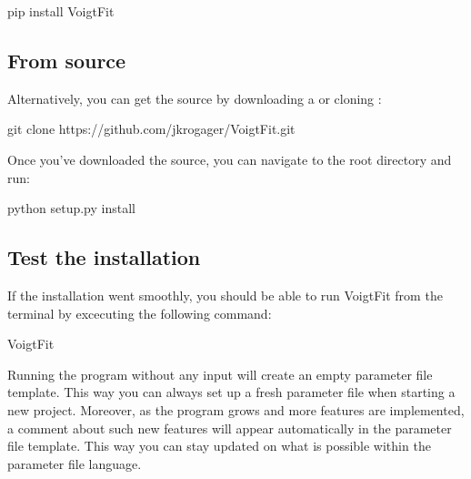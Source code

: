 \documentclass[letterpaper,10pt,english]{sphinxmanual}
\begin{document}
%
\begin{sphinxVerbatim}[commandchars=\\\{\}]
\PYGZpc{}\PYG{o}{]} pip install VoigtFit
\end{sphinxVerbatim}


\subsection{From source}
\label{\detokenize{install:from-source}}
Alternatively, you can get the source by downloading a  or cloning :

%
\begin{sphinxVerbatim}[commandchars=\\\{\}]
\PYGZpc{}\PYG{o}{]} git clone https://github.com/jkrogager/VoigtFit.git
\end{sphinxVerbatim}

Once you’ve downloaded the source, you can navigate to the root
directory and run:

%
\begin{sphinxVerbatim}[commandchars=\\\{\}]
\PYGZpc{}\PYG{o}{]} python setup.py install
\end{sphinxVerbatim}


\subsection{Test the installation}
\label{\detokenize{install:h5py}}\label{\detokenize{install:test-the-installation}}
If the installation went smoothly, you should be able to run VoigtFit from the terminal
by excecuting the following command:

%
\begin{sphinxVerbatim}[commandchars=\\\{\}]
\PYGZpc{}\PYG{o}{]} VoigtFit
\end{sphinxVerbatim}

Running the program without any input will create an empty parameter file template.
This way you can always set up a fresh parameter file when starting a new project.
Moreover, as the program grows and more features are implemented, a comment about
such new features will appear automatically in the parameter file template.
This way you can stay updated on what is possible within the parameter file language.
\end{document}
